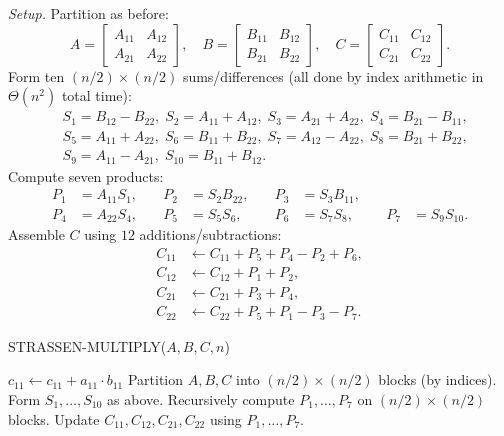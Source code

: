 \documentclass[12pt]{article}
\newcommand{\microhead}[1]{\vspace{0.45em}\noindent\textit{#1}}
\theoremstyle{definition}
\begin{document}
\microhead{Setup.} Partition as before:
\[
A=\begin{bmatrix}A_{11}&A_{12}\\A_{21}&A_{22}\end{bmatrix},\quad
B=\begin{bmatrix}B_{11}&B_{12}\\B_{21}&B_{22}\end{bmatrix},\quad
C=\begin{bmatrix}C_{11}&C_{12}\\C_{21}&C_{22}\end{bmatrix}.
\]
Form ten $(n/2)\times(n/2)$ sums/differences (all done by index arithmetic in $\Theta(n^2)$ total time):
\[
\begin{aligned}
&S_1=B_{12}-B_{22},\; S_2=A_{11}+A_{12},\; S_3=A_{21}+A_{22},\; S_4=B_{21}-B_{11},\\
&S_5=A_{11}+A_{22},\; S_6=B_{11}+B_{22},\; S_7=A_{12}-A_{22},\; S_8=B_{21}+B_{22},\\
&S_9=A_{11}-A_{21},\; S_{10}=B_{11}+B_{12}.
\end{aligned}
\]
Compute seven products:
\[
\begin{aligned}
P_1&=A_{11}S_1,&\quad P_2&=S_2B_{22},&\quad P_3&=S_3B_{11},\\
P_4&=A_{22}S_4,&\quad P_5&=S_5S_6,&\quad P_6&=S_7S_8,&\quad P_7&=S_9S_{10}.
\end{aligned}
\]
Assemble $C$ using $12$ additions/subtractions:
\[
\begin{aligned}
C_{11}&\gets C_{11}+P_5+P_4-P_2+P_6,\\
C_{12}&\gets C_{12}+P_1+P_2,\\
C_{21}&\gets C_{21}+P_3+P_4,\\
C_{22}&\gets C_{22}+P_5+P_1-P_3-P_7.
\end{aligned}
\]

\begin{algorithm}
\caption{STRASSEN-MULTIPLY($A,B,C,n$)}\label{alg:strassen}
\begin{algorithmic}[1]
  \State $c_{11}\gets c_{11}+a_{11}\cdot b_{11}$ 
  \State \Return
\EndIf
\State Partition $A,B,C$ into $(n/2)\times(n/2)$ blocks (by indices).
\State Form $S_1,\dots,S_{10}$ as above. 
\State Recursively compute $P_1,\dots,P_7$ on $(n/2)\times(n/2)$ blocks. 
\State Update $C_{11},C_{12},C_{21},C_{22}$ using $P_1,\dots,P_7$. 
\end{algorithmic}
\end{algorithm}
\end{document}
